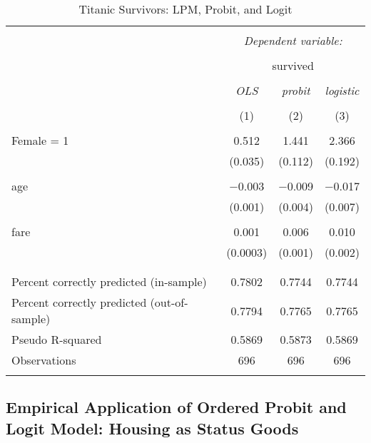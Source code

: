 \documentclass[
  12pt,
]{article}
\begin{document}
\begin{table}[t] \centering 
  \caption{Titanic Survivors: LPM, Probit, and Logit} 
  \label{titanic} 
\begin{tabular}{@{\extracolsep{5pt}}lccc} 
\\[-1.8ex]\hline 
\hline \\[-1.8ex] 
 & \multicolumn{3}{c}{\textit{Dependent variable:}} \\ 
\cline{2-4} 
\\[-1.8ex] & \multicolumn{3}{c}{survived} \\ 
\\[-1.8ex] & \textit{OLS} & \textit{probit} & \textit{logistic} \\ 
\\[-1.8ex] & (1) & (2) & (3)\\ 
\hline \\[-1.8ex] 
 Female = 1 & 0.512 & 1.441 & 2.366 \\ 
  & (0.035) & (0.112) & (0.192) \\ 
  & & & \\ 
 age & $-$0.003 & $-$0.009 & $-$0.017 \\ 
  & (0.001) & (0.004) & (0.007) \\ 
  & & & \\ 
 fare & 0.001 & 0.006 & 0.010 \\ 
  & (0.0003) & (0.001) & (0.002) \\ 
  & & & \\ 
\hline \\[-1.8ex] 
Percent correctly predicted (in-sample) & 0.7802 & 0.7744 & 0.7744 \\ 
Percent correctly predicted (out-of-sample) & 0.7794 & 0.7765 & 0.7765 \\ 
Pseudo R-squared & 0.5869 & 0.5873 & 0.5869 \\ 
Observations & 696 & 696 & 696 \\ 
\hline 
\hline \\[-1.8ex] 
\end{tabular} 
\end{table}

\hypertarget{empirical-application-of-ordered-probit-and-logit-model-housing-as-status-goods}{%
\subsection{Empirical Application of Ordered Probit and Logit Model: Housing as Status Goods}\label{empirical-application-of-ordered-probit-and-logit-model-housing-as-status-goods}}
\end{document}
